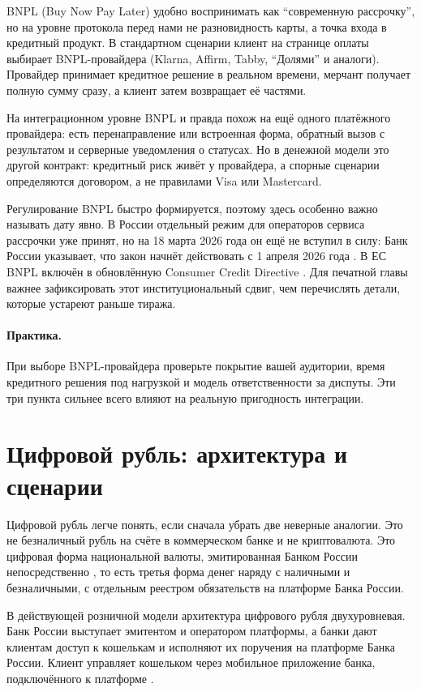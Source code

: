 BNPL (Buy Now Pay Later) удобно воспринимать как \enquote{современную
рассрочку}, но на уровне протокола перед нами не разновидность карты,
а точка входа в кредитный продукт. В стандартном сценарии клиент на
странице оплаты выбирает BNPL-провайдера (Klarna, Affirm, Tabby,
\enquote{Долями} и аналоги). Провайдер принимает кредитное решение
в реальном времени, мерчант получает полную сумму сразу, а клиент затем
возвращает её частями.

На интеграционном уровне BNPL и правда похож на ещё одного платёжного
провайдера: есть перенаправление или встроенная форма, обратный вызов
с результатом и серверные уведомления о статусах. Но в денежной модели
это другой контракт: кредитный риск живёт у провайдера, а спорные
сценарии определяются договором, а не правилами Visa
или Mastercard.

Регулирование BNPL быстро формируется, поэтому здесь особенно важно
называть дату явно. В России отдельный режим для операторов сервиса
рассрочки уже принят, но на 18 марта 2026 года он ещё не вступил
в силу: Банк России указывает, что закон начнёт действовать
с 1 апреля 2026 года \cite{cbr-osr}. В ЕС BNPL включён
в обновлённую Consumer Credit Directive \cite{eu-ccd-2023}.
Для печатной главы важнее зафиксировать этот институциональный
сдвиг, чем перечислять детали, которые устареют раньше тиража.

\paragraph{Практика.}
При выборе BNPL-провайдера проверьте покрытие вашей аудитории, время кредитного решения под нагрузкой и модель ответственности за диспуты. Эти три пункта сильнее всего влияют на реальную пригодность интеграции.


\section{Цифровой рубль: архитектура и сценарии}
\label{sec:alt-digital-ruble}

Цифровой рубль легче понять, если сначала убрать две неверные аналогии.
Это не безналичный рубль на счёте в коммерческом банке и не
криптовалюта. Это цифровая форма национальной валюты, эмитированная
Банком России непосредственно \cite{fz-340}\cite{cbr-digital-ruble},
то есть третья форма денег наряду с наличными и безналичными,
с отдельным реестром обязательств на платформе Банка России.

В действующей розничной модели архитектура цифрового рубля
двухуровневая. Банк России выступает эмитентом и оператором
платформы, а банки дают клиентам доступ к кошелькам и исполняют
их поручения на платформе Банка России. Клиент управляет кошельком
через мобильное приложение банка, подключённого к платформе
\cite{cbr-digital-ruble}.

